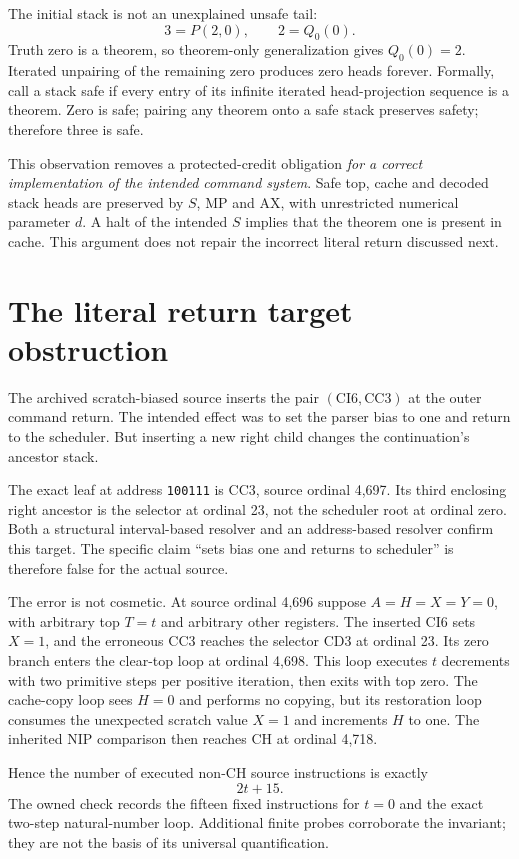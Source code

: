 \documentclass[11pt]{article}
\begin{document}
The initial stack is not an unexplained unsafe tail:
\[
 3=P(2,0),\qquad 2=Q_0(0).
\]
Truth zero is a theorem, so theorem-only generalization gives $Q_0(0)=2$. Iterated unpairing of the remaining zero produces zero heads forever. Formally, call a stack safe if every entry of its infinite iterated head-projection sequence is a theorem. Zero is safe; pairing any theorem onto a safe stack preserves safety; therefore three is safe.

This observation removes a protected-credit obligation \emph{for a correct implementation of the intended command system}. Safe top, cache and decoded stack heads are preserved by $S$, MP and AX, with unrestricted numerical parameter $d$. A halt of the intended $S$ implies that the theorem one is present in cache. This argument does not repair the incorrect literal return discussed next.

\section{The literal return target obstruction}\label{sec:error}
The archived scratch-biased source inserts the pair $(\mathrm{CI}6,\mathrm{CC}3)$ at the outer command return. The intended effect was to set the parser bias to one and return to the scheduler. But inserting a new right child changes the continuation's ancestor stack.

The exact leaf at address \texttt{100111} is $\mathrm{CC}3$, source ordinal 4,697. Its third enclosing right ancestor is the selector at ordinal 23, not the scheduler root at ordinal zero. Both a structural interval-based resolver and an address-based resolver confirm this target. The specific claim ``sets bias one and returns to scheduler'' is therefore false for the actual source.

The error is not cosmetic. At source ordinal 4,696 suppose $A=H=X=Y=0$, with arbitrary top $T=t$ and arbitrary other registers. The inserted CI6 sets $X=1$, and the erroneous CC3 reaches the selector CD3 at ordinal 23. Its zero branch enters the clear-top loop at ordinal 4,698. This loop executes $t$ decrements with two primitive steps per positive iteration, then exits with top zero. The cache-copy loop sees $H=0$ and performs no copying, but its restoration loop consumes the unexpected scratch value $X=1$ and increments $H$ to one. The inherited NIP comparison then reaches CH at ordinal 4,718.

Hence the number of executed non-CH source instructions is exactly
\[
 2t+15.
\]
The owned check records the fifteen fixed instructions for $t=0$ and the exact two-step natural-number loop. Additional finite probes corroborate the invariant; they are not the basis of its universal quantification.
\end{document}
